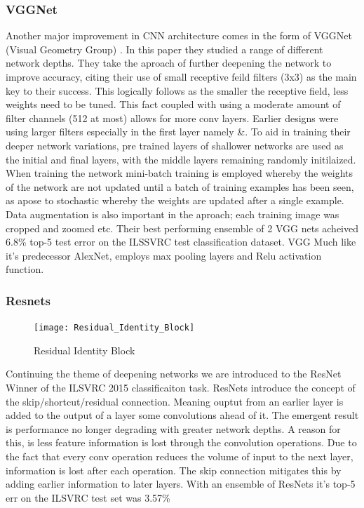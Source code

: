   \subsubsection{VGGNet}
    Another major improvement in CNN architecture comes in the form of VGGNet (Visual Geometry Group) \citep{Simonyan2015}. In this paper they studied a range of different network depths. They take the aproach of further deepening the network to improve accuracy, citing their use of small receptive feild filters (3x3) as the main key to their success. This logically follows as the smaller the receptive field, less weights need to be tuned. This fact coupled with using a moderate amount of filter channels (512 at most) allows for more conv layers. Earlier designs were using larger filters especially in the first layer namely \citep{Krizhevsky}\&\citep{Sermanet2013}. To aid in training their deeper network variations, pre trained layers of shallower networks are used as the initial and final layers, with the middle layers remaining randomly initilaized. When training the network mini-batch training is employed whereby the weights of the network are not updated until a batch of training examples has been seen, as apose to stochastic whereby the weights are updated after a single example. Data augmentation is also important in the aproach; each training image was cropped and zoomed etc. Their best performing ensemble of 2 VGG nets acheived 6.8\% top-5 test error on the ILSSVRC test classification dataset. VGG Much like it's predecessor AlexNet, employs max pooling layers and Relu activation function.
  \subsubsection{Resnets}
    \par
    \begin{figure}
      \centering
      \texttt{[image: Residual\_Identity\_Block]}
      \caption{\label{fig:resnet_id_block}Residual Identity Block}
    \end{figure}
    Continuing the theme of deepening networks we are introduced to the ResNet \citep{He} Winner of the ILSVRC 2015 classificaiton task. ResNets introduce the concept of the skip/shortcut/residual connection. Meaning ouptut from an earlier layer is added to the output of a layer some convolutions ahead of it. The emergent result is performance no longer degrading with greater network depths. A reason for this, is less feature information is lost through the convolution operations. Due to the fact that every conv operation reduces the volume of input to the next layer, information is lost after each operation. The skip connection mitigates this by adding earlier information to later layers. With an ensemble of ResNets it's top-5 err on the ILSVRC test set was 3.57\%
